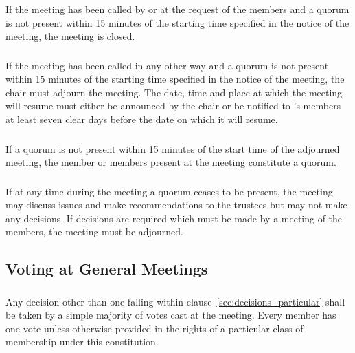         \subsubsection{}
        If the meeting has been called by or at the request of the members and a quorum is not present within 15 minutes of the starting time specified in the notice of the meeting, the meeting is closed.

        \subsubsection{}
        If the meeting has been called in any other way and a quorum is not present within 15 minutes of the starting time specified in the notice of the meeting, the chair must adjourn the meeting. The date, time and place at which the meeting will resume must either be announced by the chair or be notified to \shortname{}'s members at least seven clear days before the date on which it will resume.

        \subsubsection{}
        If a quorum is not present within 15 minutes of the start time of the adjourned meeting, the member or members present at the meeting constitute a quorum.

        \subsubsection{}
        If at any time during the meeting a quorum ceases to be present, the meeting may discuss issues and make recommendations to the trustees but may not make any decisions. If decisions are required which must be made by a meeting of the members, the meeting must be adjourned.

    \subsection{Voting at General Meetings}\label{sec:voting_general_meetings}

        \subsubsection{}
        Any decision other than one falling within clause~\ref{sec:decisions_particular} shall be taken by a simple majority of votes cast at the meeting. Every member has one vote unless otherwise provided in the rights of a particular class of membership under this constitution.

